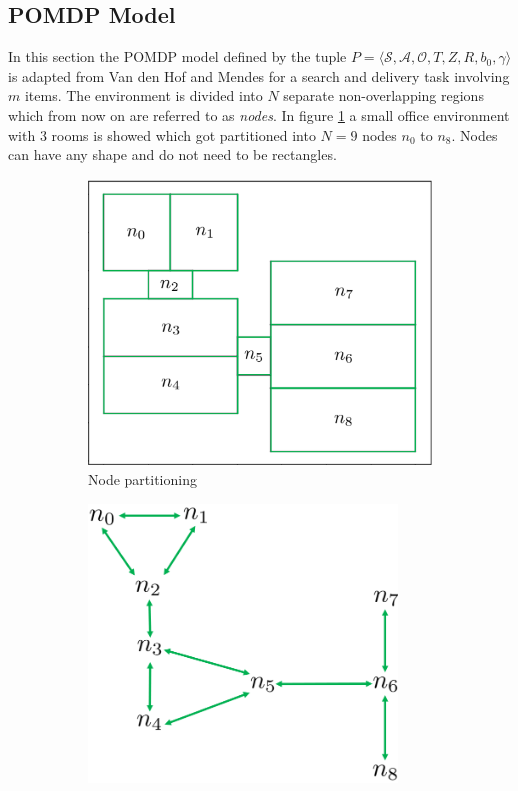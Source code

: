 \subsection{POMDP Model}\label{subsec:POMDPmodel}
In this section the POMDP model defined by the tuple $P = \langle \mathcal{S}, \mathcal{A}, \mathcal{O}, T, Z, R, b_0, \gamma \rangle$ is adapted from Van den Hof \cite{Vandenhof} and Mendes \cite{Mendes11} for a search and delivery task involving $m$ items. The environment is divided into $N$ separate non-overlapping regions which from now on are referred to as \textit{nodes}. In figure \ref{subfig:nodes} a small office environment with 3 rooms is showed which got partitioned into $N=9$ nodes $n_0$ to $n_8$. Nodes can have any shape and do not need to be rectangles.
\begin{figure}
    \centering
    \begin{subfigure}[b]{0.48\textwidth}
        \includegraphics[width=1.0\textwidth]{Report/images/envsmall_l2.png}
        \caption{Node partitioning}
        \label{subfig:nodes}
    \end{subfigure}
    \begin{subfigure}[b]{0.48\textwidth}
    \includegraphics[width=0.9\textwidth]{Report/images/nodeconnectiongraph.png}

\end{subfigure}
\end{figure}

